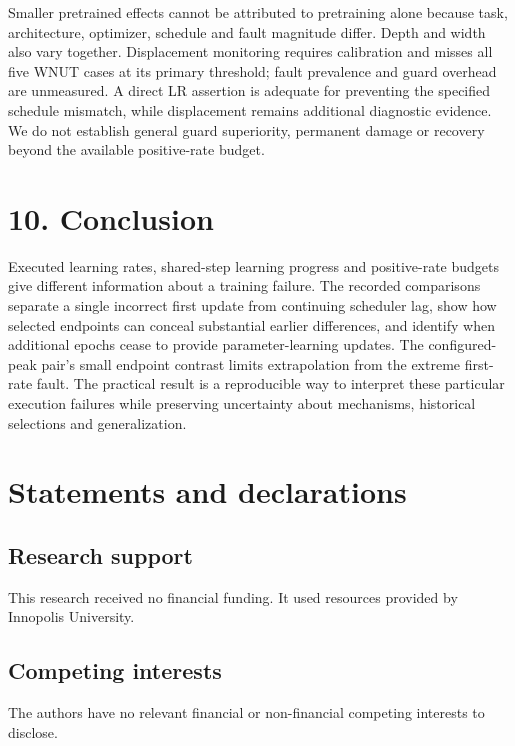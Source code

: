 \documentclass[smallextended]{svjour3}
\begin{document}
Smaller pretrained effects cannot be attributed to pretraining alone because task, architecture, optimizer, schedule and fault magnitude differ. Depth and width also vary together. Displacement monitoring requires calibration and misses all five WNUT cases at its primary threshold; fault prevalence and guard overhead are unmeasured. A direct LR assertion is adequate for preventing the specified schedule mismatch, while displacement remains additional diagnostic evidence. We do not establish general guard superiority, permanent damage or recovery beyond the available positive-rate budget.

\section{10. Conclusion}\label{conclusion}

Executed learning rates, shared-step learning progress and positive-rate budgets give different information about a training failure. The recorded comparisons separate a single incorrect first update from continuing scheduler lag, show how selected endpoints can conceal substantial earlier differences, and identify when additional epochs cease to provide parameter-learning updates. The configured-peak pair's small endpoint contrast limits extrapolation from the extreme first-rate fault. The practical result is a reproducible way to interpret these particular execution failures while preserving uncertainty about mechanisms, historical selections and generalization.

\section{Statements and declarations}\label{statements-and-declarations}

\subsection{Research support}\label{research-support}

This research received no financial funding. It used resources provided by Innopolis University.

\subsection{Competing interests}\label{competing-interests}

The authors have no relevant financial or non-financial competing interests to disclose.
\end{document}
